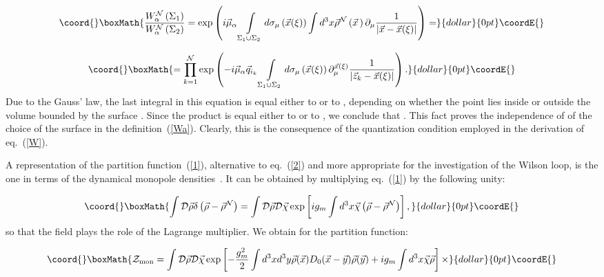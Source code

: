 \documentclass[a4paper,12pt]{article}
\begin{document}
$$\coord{}\boxMath{
\frac{W_\alpha^{\cal N}\left(\Sigma_1\right)}{W_\alpha^{\cal N}\left(\Sigma_2\right)}=\exp\left(i\vec\mu_\alpha
\int\limits_{\Sigma_1\cup\Sigma_2}^{}d\sigma_\mu\left(\vec x(\xi)\right)\int d^3x\vec\rho^{\cal N}
\left(\vec x{\,}\right)\partial_\mu\frac{1}{\left|\vec x-\vec x(\xi)\right|}\right)=}{dollar}{0pt}\coordE{}$$

$$\coord{}\boxMath{
=\prod\limits_{k=1}^{\cal N}\exp\left(-i\vec\mu_\alpha\vec q_{i_k}
\int\limits_{\Sigma_1\cup\Sigma_2}^{}d\sigma_\mu\left(\vec x(\xi)\right)\partial_\mu^{\vec x(\xi)}
\frac{1}{\left|\vec z_k-\vec x(\xi)\right|}\right).}{dollar}{0pt}\coordE{}$$
Due to the Gauss' law, the last integral in this equation is equal either to \myHighlight{$-4\pi$}\coordHE{} or to \coordHE{}, depending on whether
the point \coordHE{} lies inside or outside the volume bounded by the surface \coordHE{}. Since the product
\coordHE{} is equal either to \coordHE{} or to \coordHE{}, we conclude that
\coordHE{}. This fact proves the
independence of \coordHE{} of the choice of the surface \myHighlight{$\Sigma$}\coordHE{} in the definition~(\ref{Wa}).
Clearly, this is the consequence of the quantization condition \coordHE{} employed in the derivation of eq.~(\ref{W}).

A representation of the partition function~(\ref{1}), alternative to eq.~(\ref{2}) and more appropriate for the
investigation of the Wilson loop, is the one in terms of the
dynamical monopole densities~\cite{mpla}.
It can be obtained by multiplying eq.~(\ref{1}) by the following unity:

$$\coord{}\boxMath{
\int {\cal D}\vec\rho\delta\left(\vec\rho-\vec\rho^{\cal N}\right)=
\int {\cal D}\vec\rho{\cal D}\vec\chi\exp\left[ig_m\int d^3x\vec\chi\left(\vec\rho
-\vec\rho^{\cal N}\right)\right],}{dollar}{0pt}\coordE{}$$
so that the field \myHighlight{$\vec\chi$}\coordHE{} plays the role of the Lagrange multiplier. We obtain for the partition function:

$$\coord{}\boxMath{
{\cal Z}_{\rm mon}=\int{\cal D}\vec\rho{\cal D}\vec\chi\exp\left[-\frac{g_m^2}{2}\int d^3x d^3y\vec\rho(\vec x)D_0(\vec x-\vec y)
\vec\rho(\vec y)+ig_m\int d^3x\vec\chi\vec\rho\right]\times}{dollar}{0pt}\coordE{}$$
\end{document}
